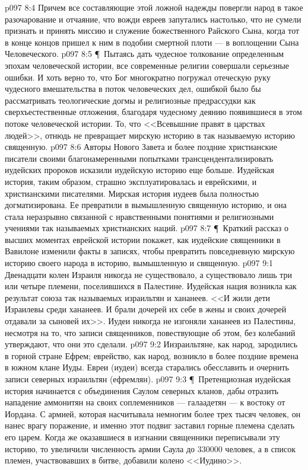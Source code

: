 \vs p097 8:4 Причем все составляющие этой ложной надежды повергли народ в такое разочарование и отчаяние, что вожди евреев запутались настолько, что не сумели признать и принять миссию и служение божественного Райского Сына, когда тот в конце концов пришел к ним в подобии смертной плоти --- в воплощении Сына Человеческого.
\vs p097 8:5 \P\ Пытаясь дать чудесное толкование определенным эпохам человеческой истории, все современные религии совершали серьезные ошибки. И хоть верно то, что Бог многократно погружал отеческую руку чудесного вмешательства в поток человеческих дел, ошибкой было бы рассматривать теологические догмы и религиозные предрассудки как сверхъестественные отложения, благодаря чудесному деянию появившиеся в этом потоке человеческой истории. То, что <<Всевышние правят в царствах людей>>, отнюдь не превращает мирскую историю в так называемую историю священную.
\vs p097 8:6 Авторы Нового Завета и более поздние христианские писатели своими благонамеренными попытками трансцендентализировать иудейских пророков исказили иудейскую историю еще больше. Иудейская история, таким образом, страшно эксплуатировалась и еврейскими, и христианскими писателями. Мирская история иудеев была полностью догматизирована. Ее превратили в вымышленную священную историю, и она стала неразрывно связанной с нравственными понятиями и религиозными учениями так называемых христианских наций.
\vs p097 8:7 \P\ Краткий рассказ о высших моментах еврейской истории покажет, как иудейские священники в Вавилоне изменили факты в записях, чтобы превратить повседневную мирскую историю своего народа в историю, вымышленную и священную.
\vs p097 9:1 Двенадцати колен Израиля никогда не существовало, а существовало лишь три или четыре племени, поселившихся в Палестине. Иудейская нация возникла как результат союза так называемых израильтян и хананеев. <<И жили дети Израилевы среди хананеев. И брали дочерей их себе в жены и своих дочерей отдавали за сыновей их>>. Иудеи никогда не изгоняли хананеев из Палестины, несмотря на то, что записи священников, повествующие об этом, без колебаний утверждают, что они это сделали.
\vs p097 9:2 Иизраильтяне, как народ, зародились в горной стране Ефрем; еврейство, как народ, возникло в более поздние времена в южном клане Иуды. Евреи (иудеи) всегда старались обесславить и очернить записи северных израильтян (ефремлян).
\vs p097 9:3 \P\ Претенциозная иудейская история начинается с объединения Саулом северных кланов, дабы отразить нападение аммонитян на своих соплеменников --- галаадетян --- к востоку от Иордана. С армией, которая насчитывала немногим более трех тысяч человек, он нанес врагу поражение, и именно этот подвиг заставил горные племена сделать его царем. Когда же оказавшиеся в изгнании священники переписывали эту историю, то увеличили численность армии Саула до 330000 человек, а в список племен, участвовавших в битве, добавили колено <<Иудино>>.
